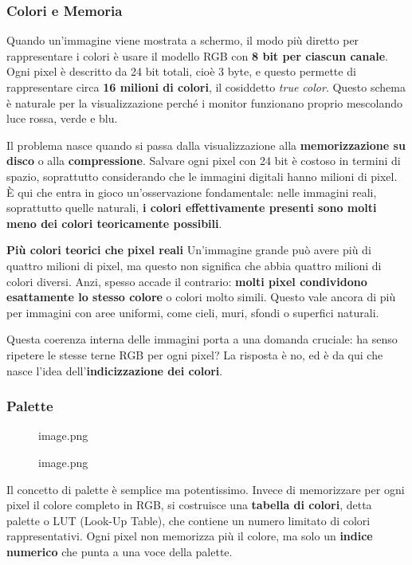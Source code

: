 \documentclass[
]{article}
\begin{document}
\hypertarget{colori-e-memoria}{%
\subsubsection{Colori e Memoria}\label{colori-e-memoria}}

Quando un'immagine viene mostrata a schermo, il modo più diretto per rappresentare i colori è usare il modello RGB con \textbf{8 bit per ciascun canale}. Ogni pixel è descritto da 24 bit totali, cioè 3 byte, e questo permette di rappresentare circa \textbf{16 milioni di colori}, il cosiddetto \emph{true color}. Questo schema è naturale per la visualizzazione perché i monitor funzionano proprio mescolando luce rossa, verde e blu.

Il problema nasce quando si passa dalla visualizzazione alla \textbf{memorizzazione su disco} o alla \textbf{compressione}. Salvare ogni pixel con 24 bit è costoso in termini di spazio, soprattutto considerando che le immagini digitali hanno milioni di pixel. È qui che entra in gioco un'osservazione fondamentale: nelle immagini reali, soprattutto quelle naturali, \textbf{i colori effettivamente presenti sono molti meno dei colori teoricamente possibili}.

\textbf{Più colori teorici che pixel reali}
Un'immagine grande può avere più di quattro milioni di pixel, ma questo non significa che abbia quattro milioni di colori diversi. Anzi, spesso accade il contrario: \textbf{molti pixel condividono esattamente lo stesso colore} o colori molto simili. Questo vale ancora di più per immagini con aree uniformi, come cieli, muri, sfondi o superfici naturali.

Questa coerenza interna delle immagini porta a una domanda cruciale: ha senso ripetere le stesse terne RGB per ogni pixel? La risposta è no, ed è da qui che nasce l'idea dell'\textbf{indicizzazione dei colori}.

\hypertarget{palette}{%
\subsubsection{Palette}\label{palette}}

\begin{figure}
\centering
{image.png}
\caption{image.png}
\end{figure}

Il concetto di palette è semplice ma potentissimo. Invece di memorizzare per ogni pixel il colore completo in RGB, si costruisce una \textbf{tabella di colori}, detta palette o LUT (Look-Up Table), che contiene un numero limitato di colori rappresentativi. Ogni pixel non memorizza più il colore, ma solo un \textbf{indice numerico} che punta a una voce della palette.
\end{document}
